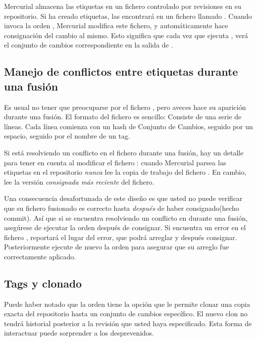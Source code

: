 Mercurial almacena las etiquetas en un fichero controlado por revisiones en
su repositorio. Si ha creado etiquetas, las encontrará en un fichero
llamado .  Cuando invoca la orden ,
Mercurial modifica este fichero, y automáticamente hace consignación del
cambio al mismo.  Esto significa que cada vez que ejecuta ,
verá el conjunto de cambios correspondiente en la salida de .

\subsection{Manejo de conflictos entre etiquetas durante una fusión}

Es usual no tener que preocuparse por el fichero ,
pero aveces hace su aparición durante una fusión. El formato del
fichero es sencillo: Consiste de una serie de líneas. Cada línea
comienza con un hash de Conjunto de Cambios, seguido por un espacio,
seguido por el nombre de un tag.

Si está resolviendo un conflicto en el fichero 
durante una fusión, hay un detalle para tener en cuenta al modificar
el fichero :
cuando Mercurial parsea las etiquetas en el repositorio \emph{nunca}
lee la copia de trabajo del fichero .  En cambio,
lee la versión \emph{consignada más reciente} del fichero.

Una consecuencia desafortunada de este diseño es que usted no puede
verificar que su fichero  fusionado es correcto hasta
\emph{después} de haber consignado(hecho commit). Así que si se
encuentra resolviendo un conflicto en  durante una
fusión, asegúrese de ejecutar la orden  después de
consignar. Si encuentra un error en el fichero , 
reportará el lugar del error, que podrá arreglar y después
consignar. Posteriormente ejecute de nuevo la orden  para
asegurar que su arreglo fue correctamente aplicado.

\subsection{Tags y clonado}

Puede haber notado que la orden  tiene la opción
 que le permite clonar una copia exacta del
repositorio hasta un conjunto de cambios específico. El nuevo clon no
tendrá historial posterior a la revisión que usted haya
especificado. Esta forma de interactuar puede sorprender a los
desprevenidos.


